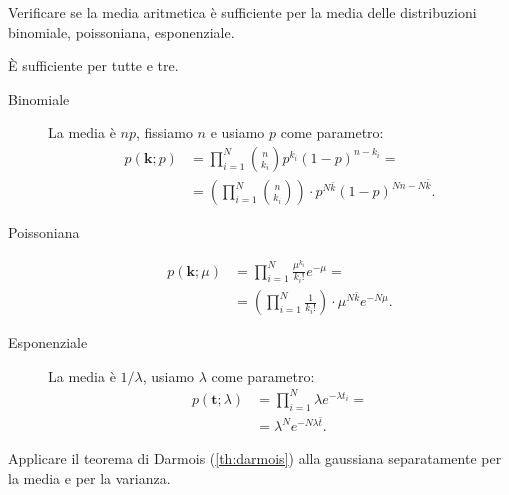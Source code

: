 \begin{exercise}
	Verificare se la media aritmetica è sufficiente per la media delle distribuzioni
	binomiale,
	poissoniana,
	esponenziale.
\end{exercise}

\begin{solution}
	È sufficiente per tutte e tre.
	\begin{description}
		\item[Binomiale]
		La media è $np$, fissiamo $n$ e usiamo $p$ come parametro:
		\begin{align*}
			p(\mathbf k;p)
			&= \prod_{i=1}^N \binom{n}{k_i} p^{k_i} (1-p)^{n-k_i} = \\
			&= \left( \prod_{i=1}^N \binom{n}{k_i} \right) \cdot
			p^{N\bar k} (1-p)^{Nn-N\bar k}.
		\end{align*}
		\item[Poissoniana]
		\begin{align*}
			p(\mathbf k;\mu)
			&= \prod_{i=1}^N \frac{\mu^{k_i}}{k_i!}e^{-\mu} = \\
			&= \left( \prod_{i=1}^N \frac1{k_i!} \right) \cdot \mu^{N\bar k} e^{-N\mu}.
		\end{align*}
		\item[Esponenziale]
		La media è $1/\lambda$, usiamo $\lambda$ come parametro:
		\begin{align*}
			p(\mathbf t;\lambda)
			&= \prod_{i=1}^N \lambda e^{-\lambda t_i} = \\
			&= \lambda^N e^{-N\lambda\bar t}.
		\end{align*}
	\end{description}
\end{solution}

\begin{exercise}
	Applicare il teorema di Darmois (\autoref{th:darmois}) alla gaussiana separatamente per la media e per la varianza.
\end{exercise}


